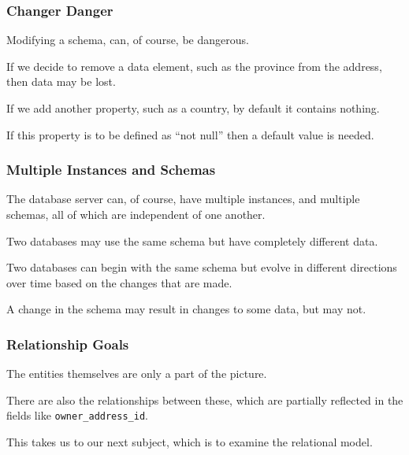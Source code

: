 \begin{frame}
\frametitle{Changer Danger}

Modifying a schema, can, of course, be dangerous. 

If we decide to remove a data element, such as the province from the address, then data may be lost. 

If we add another property, such as a country, by default it contains nothing. 

If this property is to be defined as ``not null'' then a default value is needed.


\end{frame}



\begin{frame}
\frametitle{Multiple Instances and Schemas}

The database server can, of course, have multiple instances, and multiple schemas, all of which are independent of one another. 

Two databases may use the same schema but have completely different data.

Two databases can begin with the same schema but evolve in different directions over time based on the changes that are made. 

A change in the schema may result in changes to some data, but may not.

\end{frame}



\begin{frame}
\frametitle{Relationship Goals}

The entities themselves are only a part of the picture.

There are also the relationships between these, which are partially reflected in the fields like \texttt{owner\_address\_id}. 

This takes us to our next subject, which is to examine the relational model.

\end{frame}







